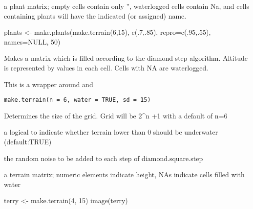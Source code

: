 \documentclass[letterpaper]{book}
\begin{document}
%
\begin{Value}
a plant matrix; empty cells contain only '', waterlogged cells contain Na,  
and cells containing plants will have the indicated (or assigned) name.
\end{Value}
%
\begin{Examples}
\begin{ExampleCode}
plants <- make.plants(make.terrain(6,15), c(.7,.85), repro=c(.95,.55), names=NULL, 50)
\end{ExampleCode}
\end{Examples}
%
\begin{Description}\relax
Makes a matrix which is filled according to the diamond step algorithm.
Altitude is represented by values in each cell. Cells with NA are waterlogged.

This is a wrapper around  and 
\end{Description}
%
\begin{Usage}
\begin{verbatim}
make.terrain(n = 6, water = TRUE, sd = 15)
\end{verbatim}
\end{Usage}
%
\begin{Arguments}
\begin{ldescription}
\item[\code{n}] Determines the size of the grid. Grid will be 2\textasciicircum{}n +1 with a default of n=6

\item[\code{water}] a logical to indicate whether terrain lower than 0 should be underwater (default:TRUE)

\item[\code{sd}] the random noise to be added to each step of diamond.square.step
\end{ldescription}
\end{Arguments}
%
\begin{Value}
a terrain matrix; numeric elements indicate height, NAs indicate cells filled with water
\end{Value}
%
\begin{Examples}
\begin{ExampleCode}
terry <- make.terrain(4, 15)
image(terry)

\end{ExampleCode}
\end{Examples}
\printindex{}
\end{document}
